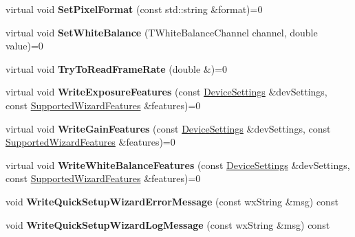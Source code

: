 \begin{DoxyCompactItemize}
\item 
\hypertarget{class_wizard_quick_setup_a0692343d7059ab5fd99bd67e4a2f6a37}{virtual void {\bfseries Set\+Pixel\+Format} (const std\+::string \&format)=0}\label{class_wizard_quick_setup_a0692343d7059ab5fd99bd67e4a2f6a37}

\item 
\hypertarget{class_wizard_quick_setup_ab1d6d4cdf0ee09eb751821ad170f2e21}{virtual void {\bfseries Set\+White\+Balance} (T\+White\+Balance\+Channel channel, double value)=0}\label{class_wizard_quick_setup_ab1d6d4cdf0ee09eb751821ad170f2e21}

\item 
\hypertarget{class_wizard_quick_setup_a3b90d2bcd0b94d638d63442ec0d8bba5}{virtual void {\bfseries Try\+To\+Read\+Frame\+Rate} (double \&)=0}\label{class_wizard_quick_setup_a3b90d2bcd0b94d638d63442ec0d8bba5}

\item 
\hypertarget{class_wizard_quick_setup_ac69ec03b3d704ffe566026b366b26885}{virtual void {\bfseries Write\+Exposure\+Features} (const \hyperlink{struct_wizard_quick_setup_1_1_device_settings}{Device\+Settings} \&dev\+Settings, const \hyperlink{struct_wizard_quick_setup_1_1_supported_wizard_features}{Supported\+Wizard\+Features} \&features)=0}\label{class_wizard_quick_setup_ac69ec03b3d704ffe566026b366b26885}

\item 
\hypertarget{class_wizard_quick_setup_a16b4ff2eb758ae569164b27f6ef43df8}{virtual void {\bfseries Write\+Gain\+Features} (const \hyperlink{struct_wizard_quick_setup_1_1_device_settings}{Device\+Settings} \&dev\+Settings, const \hyperlink{struct_wizard_quick_setup_1_1_supported_wizard_features}{Supported\+Wizard\+Features} \&features)=0}\label{class_wizard_quick_setup_a16b4ff2eb758ae569164b27f6ef43df8}

\item 
\hypertarget{class_wizard_quick_setup_ac5b8530a0e14ab1a1faf9058a394321b}{virtual void {\bfseries Write\+White\+Balance\+Features} (const \hyperlink{struct_wizard_quick_setup_1_1_device_settings}{Device\+Settings} \&dev\+Settings, const \hyperlink{struct_wizard_quick_setup_1_1_supported_wizard_features}{Supported\+Wizard\+Features} \&features)=0}\label{class_wizard_quick_setup_ac5b8530a0e14ab1a1faf9058a394321b}

\item 
\hypertarget{class_wizard_quick_setup_acac33e0f35ba360894956e79ed101405}{void {\bfseries Write\+Quick\+Setup\+Wizard\+Error\+Message} (const wx\+String \&msg) const }\label{class_wizard_quick_setup_acac33e0f35ba360894956e79ed101405}

\item 
\hypertarget{class_wizard_quick_setup_affe5b7660ba2ef7a626dc73e2a5b2342}{void {\bfseries Write\+Quick\+Setup\+Wizard\+Log\+Message} (const wx\+String \&msg) const }\label{class_wizard_quick_setup_affe5b7660ba2ef7a626dc73e2a5b2342}

\end{DoxyCompactItemize}
